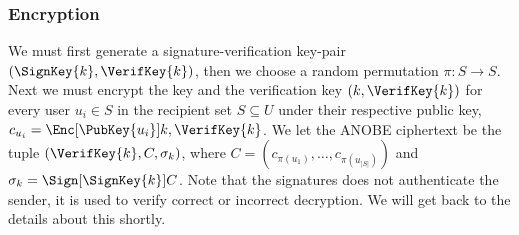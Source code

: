 \subsubsection<article>{Encryption}

We must first generate a signature-verification key-pair \((\SignKey{k}, 
  \VerifKey{k})\), then we choose a random permutation \(\pi\colon S\to S\).
Next we must encrypt the key and the verification key \((k, \VerifKey{k})\) for 
every user \(u_i\in S\) in the recipient set \(S\subseteq U\) under their 
respective public key, \(c_{u_i} = \Enc[\PubKey{u_i}]{k, \VerifKey{k}}\).
We let the \ac{ANOBE} ciphertext be the tuple \((\VerifKey{k}, C, \sigma_k)\), 
where
\(C = ( c_{\pi(u_1)}, \ldots, c_{\pi(u_{|S|})})\) and
\(\sigma_k = \Sign[\SignKey{k}]{ C }\).
Note that the signatures does not authenticate the sender, it is used to verify 
correct or incorrect decryption.
We will get back to the details about this shortly.

\begin{frame}
  \begin{figure}
    \begin{algorithmic}[1]

        \pause{}

        \EndFor{}

        \pause{}

      \EndFunction{}
    \end{algorithmic}
  \end{figure}
\end{frame}


